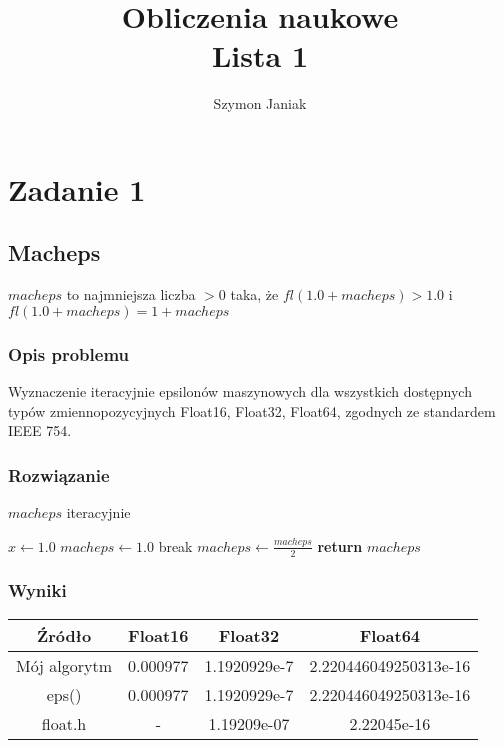 \documentclass{article}
\title{%
	Obliczenia naukowe \\
	\large Lista 1}
\author{Szymon Janiak}
\begin{document}
\maketitle

\section{Zadanie 1}
\subsection{Macheps}
	$macheps$ to najmniejsza liczba $> 0$ taka, że $fl(1.0 + macheps) > 1.0$ i $fl(1.0 + macheps) = 1 + macheps$
\subsubsection{Opis problemu}
	Wyznaczenie iteracyjnie epsilonów maszynowych dla wszystkich dostępnych typów zmiennopozycyjnych Float16, Float32, Float64, zgodnych ze standardem IEEE 754.
\subsubsection{Rozwiązanie}
	\begin{algorithm}
	\caption{$macheps$ iteracyjnie}\label{alg:cap}
	\begin{algorithmic}
        \State $x \gets 1.0$
        \State $macheps \gets 1.0$
            	\State break
            \EndIf
            \State $macheps \gets \frac{macheps}{2}$
        \EndFor
        \State \textbf{return} $macheps$
    \end{algorithmic}
    \end{algorithm}
\subsubsection{Wyniki}
	\begin{center}
        \begin{tabular}{|c||c|c|c|}
        \hline
            Źródło & Float16 & Float32 & Float64 \\
            \hline\hline
            Mój algorytm & 0.000977 & 1.1920929e-7 & 2.220446049250313e-16\\
            \hline
            eps() & 0.000977 & 1.1920929e-7 & 2.220446049250313e-16\\
            \hline
            float.h & - & 1.19209e-07 & 2.22045e-16 \\
        \hline
        \end{tabular}
    \end{center}
\end{document}
